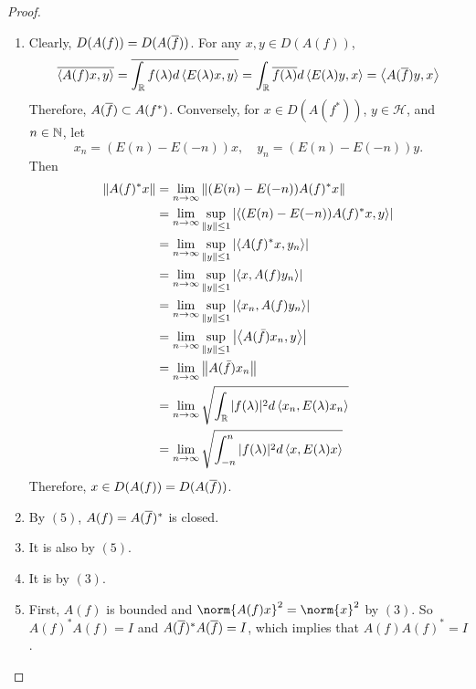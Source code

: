 \documentclass[a4paper,12pt]{article}
\begin{document}
\begin{proof}
\begin{enumerate}[label=(\arabic{*})]
        \item Clearly, $D(A(f)) = D(A(\overline{f}))$. For any $x,y \in D(A(f))$,
        \begin{equation*}
            \overline{\left\langle A(f)x,y \right\rangle} = \overline{\int_{\mathbb{R}} f(\lambda) d \left\langle E(\lambda)x,y \right\rangle} = \int_{\mathbb{R}} \overline{f(\lambda)} d \left\langle E(\lambda)y,x \right\rangle = \left\langle A(\overline{f})y,x \right\rangle
        \end{equation*}
        Therefore, $A(\overline{f}) \subset A(f^*)$. Conversely, for $x \in D(A(f^*))$, $y \in \mathcal{H}$, and $n \in \mathbb{N}$, let
        \begin{equation*}
            x_n=(E(n)-E(-n)) x,\quad y_n=(E(n)-E(-n)) y.
        \end{equation*}
        Then 
        \begin{equation*}
            \begin{aligned}
                \begin{aligned}
                    \left\|A(f)^* x\right\| & =\lim _{n \rightarrow \infty}\left\|(E(n)-E(-n)) A(f)^* x\right\| \\
                    & =\lim _{n \rightarrow \infty} \sup _{\|y\| \leq 1}\left|\left\langle (E(n)-E(-n)) A(f)^* x, y \right\rangle\right| \\
                    & =\lim _{n \rightarrow \infty} \sup _{\|y\| \leq 1}\left|\left\langle A(f)^* x, y_n \right\rangle\right| \\
                    & =\lim _{n \rightarrow \infty} \sup _{\|y\| \leq 1}\left|\left\langle x, A(f) y_n \right\rangle\right| \\
                    & =\lim _{n \rightarrow \infty} \sup _{\|y\| \leq 1}\left|\left\langle x_n, A(f) y_n \right\rangle\right| \\
                    & =\lim _{n \rightarrow \infty} \sup _{\|y\| \leq 1}\left|\left\langle A(\bar{f}) x_n, y \right\rangle\right| \\
                    & =\lim _{n \rightarrow \infty}\left\|A(\bar{f}) x_n\right\| \\
                    & =\lim _{n \rightarrow \infty} \sqrt{\int_{\mathbb{R}}|f(\lambda)|^2 d \left\langle x_n, E(\lambda) x_n \right\rangle} \\
                    & =\lim _{n \rightarrow \infty} \sqrt{\int_{-n}^n|f(\lambda)|^2 d\left\langle x, E(\lambda) x \right\rangle} 
                \end{aligned}
            \end{aligned}
        \end{equation*}
        Therefore, $x \in D(A(f)) = D(A(\overline{f}))$.

        \item By $(5)$, $A(f) = A(\overline{f})^*$ is closed.

        \item It is also by $(5)$.

        \item It is by $(3)$.

        \item First, $A(f)$ is bounded and $\norm{A(f)x}^2 = \norm{x}^2$ by $(3)$. So $A(f)^*A(f) = I$ and $A(\overline{f})^*A(\overline{f}) = I$, which implies that $A(f)A(f)^* = I$. \qedhere
    \end{enumerate}
\end{proof}
\end{document}
